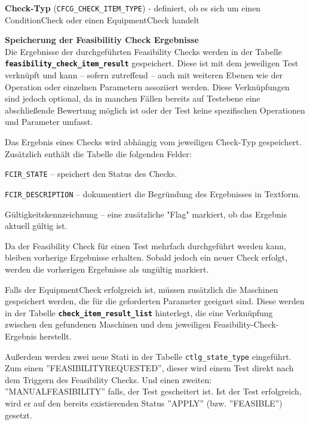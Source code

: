 \textbf{Check-Typ} (\texttt{CFCG\_CHECK\_ITEM\_TYPE}) - definiert, ob es sich um einen \gls{ConditionCheck} oder einen \gls{EquipmentCheck} handelt

\setlength{\leftskip}{0em} 


\textbf{Speicherung der Feasibilitiy Check Ergebnisse} \\
Die Ergebnisse der durchgeführten Feasibility Checks werden in der Tabelle \textbf{\texttt{feasibility\_check\_item\_result}} gespeichert. Diese ist mit dem jeweiligen Test verknüpft und kann – sofern zutreffend – auch mit weiteren Ebenen wie der Operation oder einzelnen Parametern assoziiert werden. Diese Verknüpfungen sind jedoch optional, da in manchen Fällen bereits auf Testebene eine abschließende Bewertung möglich ist oder der Test keine spezifischen Operationen und Parameter umfasst.

Das Ergebnis eines Checks wird abhängig vom jeweiligen Check-Typ gespeichert. Zusätzlich enthält die Tabelle die folgenden Felder:

\setlength{\leftskip}{1em}

\texttt{FCIR\_STATE} – speichert den Status des Checks.

\texttt{FCIR\_DESCRIPTION} – dokumentiert die Begründung des Ergebnisses in Textform.

Gültigkeitskennzeichnung – eine zusätzliche "Flag" markiert, ob das Ergebnis aktuell gültig ist.

\setlength{\leftskip}{0em}

Da der Feasibility Check für einen Test mehrfach durchgeführt werden kann, bleiben vorherige Ergebnisse erhalten. Sobald jedoch ein neuer Check erfolgt, werden die vorherigen Ergebnisse als ungültig markiert.

Falls der \gls{EquipmentCheck} erfolgreich ist, müssen zusätzlich die Maschinen gespeichert werden, die für die geforderten Parameter geeignet sind. Diese werden in der Tabelle \textbf{\texttt{check\_item\_result\_list}} hinterlegt, die eine Verknüpfung zwischen den gefundenen Maschinen und dem jeweiligen Feasibility-Check-Ergebnis herstellt.

Außerdem werden zwei neue Stati in der Tabelle \texttt{ctlg\_state\_type} eingeführt. Zum einen ''FEASIBILITYREQUESTED'', dieser wird einem Test direkt nach dem Triggern des Feasibility Checks. Und einen zweiten: ''MANUALFEASIBILITY'' falls, der Test gescheitert ist. Ist der Test erfolgreich, wird er auf den bereits existierenden Status ''APPLY'' (bzw. ''FEASIBLE'') gesetzt. 



